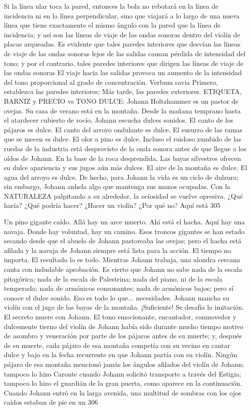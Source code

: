 Si la línea ular toca la pared, entonces la bola no rebotará en la línea de incidencia ni en la línea perpendicular, sino que viajará a lo largo de una nueva línea que tiene exactamente el mismo ángulo con la pared que la línea de incidencia; y así son las líneas de viaje de las ondas sonoras dentro del violín de placas arqueadas. Es evidente que tales paredes interiores que desvían las líneas de viaje de las ondas sonoras lejos de las salidas causan pérdida de intensidad del tono; y por el contrario, tales paredes interiores que dirigen las líneas de viaje de las ondas sonoras
El viaje hacia las salidas provoca un aumento de la intensidad del tono proporcional al grado de concentración. Verbum savia Primero, establezca las paredes interiores;
Más tarde, las paredes exteriores.
ETIQUETA, BARNIZ y PRECIO vs TONO DULCE: Johann Holtzhammer es un pastor de ovejas. Su casa de verano está en la montaña. Desde la mañana temprano hasta el atardecer cubierto de rocío, Johann escucha dulces sonidos. El canto de los pájaros es dulce. El canto del arroyo ondulante es dulce. El susurro de las ramas que se mecen es dulce. El olor a pino es dulce. Incluso el ruidoso zumbido de las ruedas de la industria está desprovisto de la onda sonora antes de que llegue a los oídos de Johann. En la base de la roca desprendida,
Las bayas silvestres ofrecen su dulce apariencia y sus jugos aún más dulces. El aire de la montaña es dulce. El agua del arroyo es dulce. De hecho, para Johann la vida es un ciclo de dulzura; sin embargo, Johann anhela algo que mantenga sus manos ocupadas. Con la NATURALEZA palpitando a su alrededor, la ociosidad se vuelve opresiva. ¿Qué haría? ¿Qué podría hacer? ¿Hacer un violín? ¿Por qué no? Aquí está
305

Un pino gigante caído. Allá hay un arce muerto. Ahí está el hacha. Aquí hay una navaja. Donde hay voluntad, hay un camino. Esos troncos gigantes se han estado secando desde que el abuelo de Johann pastoreaba las ovejas; pero el hacha está afilada y la navaja de Johann siempre está lista para la acción. El tiempo no importa. El resultado lo es todo. Mientras Johann trabaja, una alondra cercana canta con indudable aprobación. Es cierto que Johann no sabe nada de la escala pitagórica; nada de la escala de Palestrina; nada del piano, ni de la escala temperada; nada de armónicos consonantes; nada de armónicos bajos; pero sí conoce el dulce sonido. Eso es todo lo que...
necesidades.
Johann mancha su violín con el jugo de las bayas de la montaña.
¡Suficiente!
Se desafía la imitación. El secreto muere con Johann.
El tono emocionante, encantador, conmovedor y dulcemente tierno del violín de Johann había sido durante mucho tiempo motivo de asombro y veneración por parte de los pájaros antes de su muerte; y, después de su muerte, cada pájaro de esa montaña competía con su vecino en cantar dulce y bajo en la fecha recurrente en que Johann partía con su violín. Ningún pájaro de esa montaña mencionó jamás los ángulos afilados del violín de Johann; tampoco lo hizo Caronte cuando Johann solicitó transporte a través del Estigia; tampoco lo hizo el guardián de la gran puerta, como aparece en la continuación. Cuando Johann entró en la larga avenida, una multitud de sombras con los ojos caídos estaban de pie en un
306

